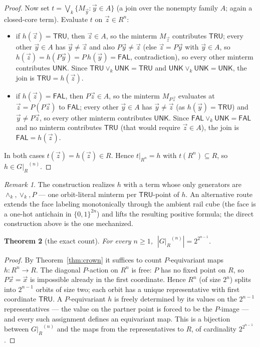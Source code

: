 \documentclass[11pt]{article}
\newtheorem{theorem}{Theorem}[section]
\theoremstyle{remark}
\newtheorem{remarkc}[theorem]{Remark}
\newcommand{\UNK}{\ensuremath{\mathsf{UNK}}}
\newcommand{\FAL}{\ensuremath{\mathsf{FAL}}}
\newcommand{\TRU}{\ensuremath{\mathsf{TRU}}}
\newcommand{\meetk}{\ensuremath{\wedge_k}}
\newcommand{\joink}{\ensuremath{\vee_k}}
\newcommand{\GR}{\ensuremath{G|_R}}
\begin{document}
\begin{proof}
Now set $t=\bigvee_k\{M_{\vec y} : \vec y\in A\}$ (a join over the
nonempty family $A$; again a closed-core term). Evaluate $t$ on
$\vec z\in R^n$:
\begin{itemize}
\item if $h(\vec z)=\TRU$, then $\vec z\in A$, so the minterm
  $M_{\vec z}$ contributes \TRU; every other $\vec y\in A$ has
  $\vec y\ne\vec z$ and also $P\vec y\ne\vec z$ (else $\vec z=P\vec y$
  with $\vec y\in A$, so $h(\vec z)=h(P\vec y)=P\,h(\vec y)=\FAL$,
  contradiction), so every other minterm contributes \UNK. Since
  $\TRU\joink\UNK=\TRU$ and $\UNK\joink\UNK=\UNK$, the join is
  $\TRU=h(\vec z)$.
\item if $h(\vec z)=\FAL$, then $P\vec z\in A$, so the minterm
  $M_{P\vec z}$ evaluates at $\vec z=P(P\vec z)$ to \FAL; every other
  $\vec y\in A$ has $\vec y\ne\vec z$ (as $h(\vec y)=\TRU$) and
  $\vec y\ne P\vec z$, so every other minterm contributes \UNK. Since
  $\FAL\joink\UNK=\FAL$ and no minterm contributes \TRU{} (that would
  require $\vec z\in A$), the join is $\FAL=h(\vec z)$.
\end{itemize}
In both cases $t(\vec z)=h(\vec z)\in R$. Hence $t|_{R^n}=h$ with
$t(R^n)\subseteq R$, so $h\in\GR^{(n)}$.
\end{proof}

\begin{remarkc}
The construction realizes $h$ with a term whose only generators are
$\meetk,\joink,P$ --- one orbit-literal minterm per \TRU-point of $h$. An
alternative route extends the face labeling monotonically through the
ambient rail cube (the face is a one-hot antichain in $\{0,1\}^{2n}$) and
lifts the resulting positive formula; the direct construction above is
the one mechanized.
\end{remarkc}

\begin{theorem}[the exact count]\label{thm:count}
For every $n\ge 1$, $\;|\GR^{(n)}| = 2^{2^{n-1}}$.
\end{theorem}

\begin{proof}
By Theorem~\ref{thm:crown} it suffices to count $P$-equivariant maps
$h:R^n\to R$. The diagonal $P$-action on $R^n$ is free: $P$ has no fixed
point on $R$, so $P\vec x=\vec x$ is impossible already in the first
coordinate. Hence $R^n$ (of size $2^n$) splits into $2^{n-1}$ orbits of
size two; each orbit has a unique representative with first coordinate
\TRU. A $P$-equivariant $h$ is freely determined by its values on the
$2^{n-1}$ representatives --- the value on the partner point is forced to
be the $P$-image --- and every such assignment defines an equivariant
map. This is a bijection between $\GR^{(n)}$ and the maps from the
representatives to $R$, of cardinality $2^{2^{n-1}}$.
\end{proof}
\end{document}
